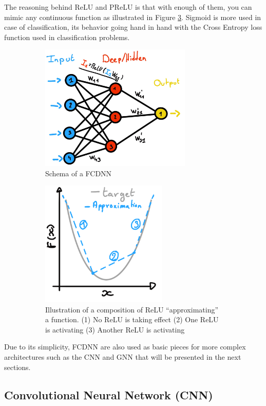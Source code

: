 \documentclass[../main.tex]{subfiles}
\begin{document}
The reasoning behind ReLU and PReLU is that with enough of them, you can mimic any continuous function as illustrated in Figure \ref{fig:ml:relu-mimic}. Sigmoid is more used in case of classification, its behavior going hand in hand with the Cross Entropy loss function used in classification problems.

\begin{figure}[ht]
  \begin{subfigure}[t]{0.48\textwidth}
    \centering
    \includegraphics[height=6cm]{images/ml/fcdnn_scheme.jpg}
    \caption{Schema of a FCDNN}
    \label{fig:ml:fcdnn}
  \end{subfigure}
  \hfill
  \begin{subfigure}[t]{0.48\textwidth}
    \centering
    \includegraphics[height=6cm]{images/ml/relu_approx.png}
    \caption{Illustration of a composition of ReLU ``approximating'' a function. (1) No ReLU is taking effect (2) One ReLU is activating (3) Another ReLU is activating}
    \label{fig:ml:relu-mimic}
  \end{subfigure}
  \caption{}
\end{figure}

Due to its simplicity, FCDNN are also used as basic pieces for more complex architectures such as the CNN and GNN that will be presented in the next sections.

\subsection{Convolutional Neural Network (CNN)}
\label{sec:ml:cnn}
\end{document}
